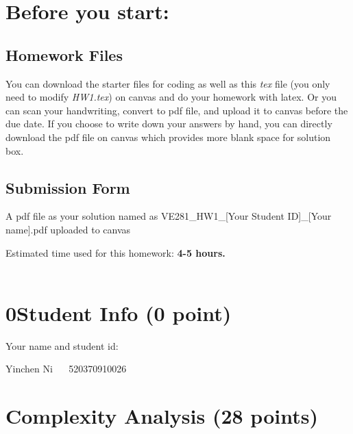\documentclass[11pt]{exam}
\begin{document}
\setlength{\parindent}{0pt}
\section*{Before you start:}

\subsection*{Homework Files}
You can download the starter files for coding as well as this \textit{tex} file (you only need to modify \textit{HW1.tex}) on canvas and do your homework with latex. Or you can scan your handwriting, convert to pdf file, and upload it to canvas before the due date. If you choose to write down your answers by hand, you can directly download the pdf file on canvas which provides more blank space for solution box.\\

\subsection*{Submission Form}
A pdf file as your solution named as VE281\_HW1\_[Your Student ID]\_[Your name].pdf uploaded to canvas

Estimated time used for this homework: \textbf{4-5 hours.}
\\\\

\newpage
\section*{0\quad Student Info (0 point)}
Your name and student id:
\begin{solution}
    Yinchen Ni ~~ 520370910026
\end{solution}

\section{Complexity Analysis (28 points)}
\end{document}
